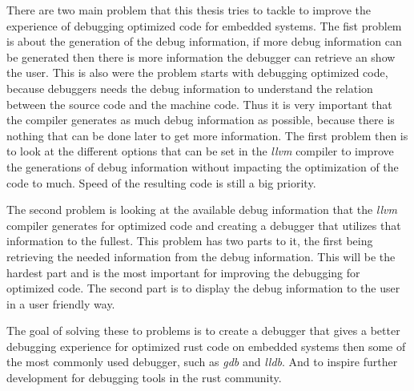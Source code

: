  


There are two main problem that this thesis tries to tackle to improve the experience of debugging optimized code for embedded systems.
The fist problem is about the generation of the debug information, if more debug information can be generated then there is more information the debugger can retrieve an show the user.
This is also were the problem starts with debugging optimized code, because debuggers needs the debug information to understand the relation between the source code and the machine code.
Thus it is very important that the compiler generates as much debug information as possible, because there is nothing that can be done later to get more information.
The first problem then is to look at the different options that can be set in the \emph{llvm} compiler to improve the generations of debug information without impacting the optimization of the code to much.
Speed of the resulting code is still a big priority.


The second problem is looking at the available debug information that the \emph{llvm} compiler generates for optimized code and creating a debugger that utilizes that information to the fullest.
This problem has two parts to it, the first being retrieving the needed information from the debug information.
This will be the hardest part and is the most important for improving the debugging for optimized code.
The second part is to display the debug information to the user in a user friendly way.


The goal of solving these to problems is to create a debugger that gives a better debugging experience for optimized rust code on embedded systems then some of the most commonly used debugger, such as \emph{gdb} and \emph{lldb}.
And to inspire further development for debugging tools in the rust community.

